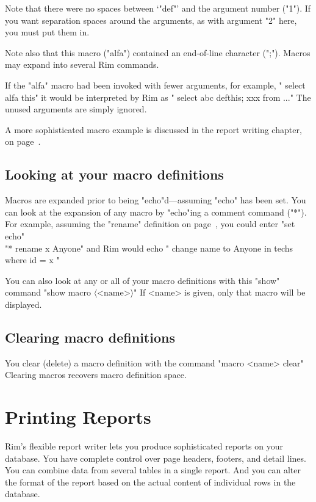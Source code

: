 \documentclass[11pt,a4paper]{report}
\def\opt#1{$\langle \mbox{#1} \rangle$}
\def\I{\index}
\begin{document}
Note that there were no spaces between `"def"' and the argument number ("1").
If you want separation spaces around the arguments, as with argument
"2" here, you must put them in.
 
Note also that this macro ("alfa") contained an end-of-line character
(";").  Macros may expand into several Rim commands.
 
If the "alfa" macro had been invoked with fewer arguments, for example,
" select alfa this"
it would be interpreted by Rim as
" select abc  defthis; xxx from ..."
The unused arguments are simply ignored.
 
A more sophisticated macro example is discussed
in the report writing chapter, on page~\pageref{run-mac}.
 
\section{Looking at your macro definitions}
\label{show-mac}
Macros are expanded prior to being "echo"d---assuming "echo"
has been set.
You can look at the expansion of any macro by "echo"ing a
comment command ("*").  For example, assuming the "rename" 
definition on page~\pageref{rename-def}, you could enter
"set echo"\\"* rename x Anyone"
and Rim would echo
" change name to Anyone in techs where id = x "
   

You can also look at any or all of your macro definitions
with this "show" command
"show macro \opt{<name>}"
If <name> is given, only that macro will be displayed.
 
\section{Clearing macro definitions}
You clear (delete) a macro definition with the command
"macro <name> clear"
Clearing macros recovers macro definition space.
\I{macros|)}
 
 
%
%
\def\demobreak{\par\pagebreak[3]\bigskip}

%
\chapter{Printing Reports}
%
\label{report-writer}
\I{Reports|(}
Rim's flexible report writer lets you produce
sophisticated reports on your database.
You have complete control over page headers, footers,
and detail lines.  You can combine data from several tables
in a single report. And you can alter the format of the
report based on the actual content of individual rows
in the database.
 
\end{document}
